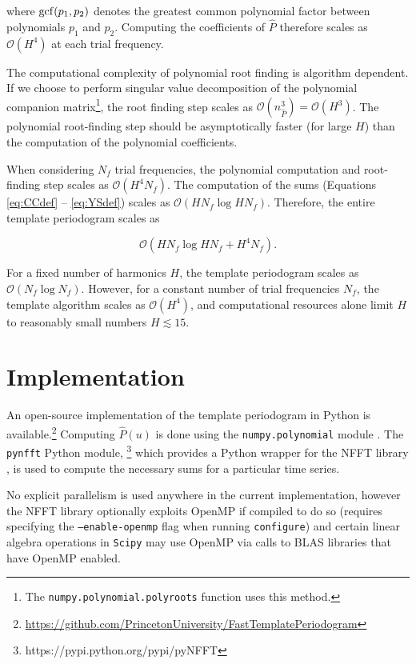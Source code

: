 \documentclass[iop]{emulateapj}
\newcommand{\bigO}{\mathcal{O}}
\begin{document}
\noindent where ${\rm gcf}(p_1, p_2)$ denotes the greatest common polynomial factor
between polynomials $p_1$ and $p_2$. Computing the coefficients of $\hat{P}$ therefore
scales as $\bigO(H^4)$ at each trial frequency. 

The computational complexity of polynomial root finding
is algorithm dependent. If we choose to perform singular value decomposition of
the polynomial companion matrix\footnote{The \texttt{numpy.polynomial.polyroots} 
function uses this method.}, the root finding step scales as 
$\bigO(n_{\hat{P}}^3) = \bigO(H^3)$. The polynomial root-finding step 
should be asymptotically faster (for large $H$) than the computation of 
the polynomial coefficients.

When considering $N_f$ trial frequencies, the polynomial computation and root-finding 
step scales as $\bigO(H^4N_f)$. The computation of the sums 
(Equations \ref{eq:CCdef} -- \ref{eq:YSdef}) scales as $\bigO(HN_f\log HN_f)$.
Therefore, the entire template periodogram scales as 

\begin{equation}
\bigO(HN_f \log HN_f + H^4N_f).
\end{equation}

For a fixed number of harmonics $H$, the template periodogram scales as
$\bigO(N_f\log N_f)$. However, for a constant number of trial frequencies $N_f$, 
the template algorithm scales as $\bigO(H^4)$, and computational resources
alone limit $H$ to reasonably small numbers $H\lesssim15$.


\section{Implementation}
An open-source implementation of the template periodogram in Python is
available.\footnote{\url{https://github.com/PrincetonUniversity/FastTemplatePeriodogram}} 
Computing $\hat{P}(u)$ is done using the \texttt{numpy.polynomial} module 
\citep{Scipy}. The \texttt{pynfft} Python module,
\footnote{https://pypi.python.org/pypi/pyNFFT} which provides a Python 
wrapper for the NFFT library \citep{NFFT}, is used to compute the necessary 
sums for a particular time series.

No explicit parallelism is used anywhere in the current implementation, 
however the NFFT library optionally exploits OpenMP if compiled
to do so (requires specifying the \texttt{--enable-openmp} flag
when running \texttt{configure}) and certain linear algebra operations
in \texttt{Scipy} may use OpenMP via calls to BLAS libraries that
have OpenMP enabled.
\end{document}
